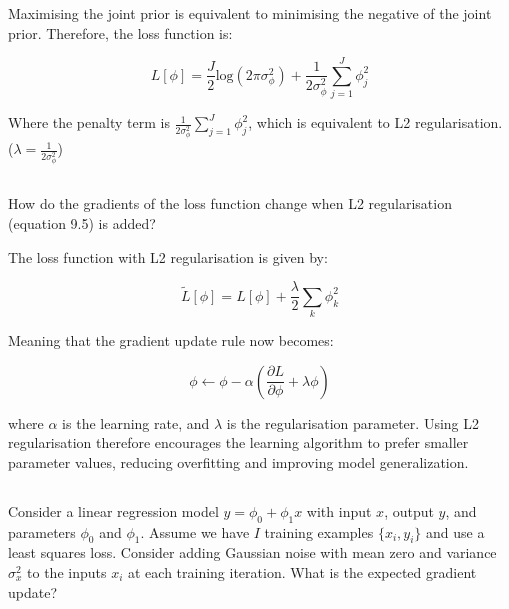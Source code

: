 \documentclass[12pt]{report}
\begin{document}
Maximising the joint prior is equivalent to minimising the negative of the joint prior. Therefore, the loss function is:

\begin{equation*}
    L[\phi] = \frac{J}{2}\text{log}(2\pi\sigma_{\phi}^{2}) + \frac{1}{2\sigma_{\phi}^{2}}\sum_{j=1}^{J}\phi_{j}^{2}
\end{equation*}

Where the penalty term is $\frac{1}{2\sigma_{\phi}^{2}}\sum_{j=1}^{J}\phi_{j}^{2}$, which is equivalent to L2 regularisation. ($\lambda = \frac{1}{2\sigma_{\phi}^{2}}$)

\subsection{}
\begin{mdframed}
    How do the gradients of the loss function change when L2 regularisation (equation 9.5) is added?
\end{mdframed}

The loss function with L2 regularisation is given by:

\begin{equation*}
    \tilde{L}[\phi] = L[\phi] + \frac{\lambda}{2}\sum_{k}\phi_{k}^{2}
\end{equation*}

Meaning that the gradient update rule now becomes:

\begin{equation*}
    \phi \leftarrow \phi - \alpha \left(\frac{\partial L}{\partial \phi} + \lambda \phi\right)
\end{equation*}

where $\alpha$ is the learning rate, and $\lambda$ is the regularisation parameter. Using L2 regularisation therefore encourages the learning algorithm to prefer smaller parameter values, reducing overfitting and improving model generalization.

\subsection{}
\begin{mdframed}
    Consider a linear regression model $y= \phi_{0} + \phi_{1}x$ with input $x$, output $y$, and parameters $\phi_{0}$ and $\phi_{1}$. Assume we have $I$ training examples $\{x_{i}, y_{i}\}$ and use a least squares loss. Consider adding Gaussian noise with mean zero and variance $\sigma_{x}^{2}$ to the inputs $x_{i}$ at each training iteration. What is the expected gradient update?
\end{mdframed}
\end{document}
